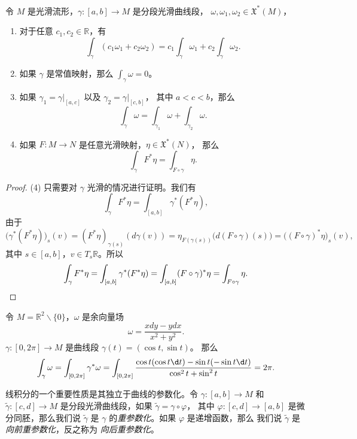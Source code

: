 \documentclass[fontset=none]{Notes}
\begin{document}
\begin{proposition}[线积分的性质]
  令 $M$ 是光滑流形，$\gamma:[a,b]\to M$ 是分段光滑曲线段，
  $\omega,\omega_1,\omega_2\in \mathfrak{X}^*(M)$，
  \begin{enumerate}
    \item 对于任意 $c_1,c_2\in \mathbb{R}$，有
    \[
      \int_\gamma(c_1\omega_1+c_2\omega_2)=c_1\int_\gamma\omega_1+
      c_2\int_\gamma\omega_2.  
    \]
    \item 如果 $\gamma$ 是常值映射，那么 $\int_\gamma\omega=0$。
    \item 如果 $\gamma_1=\gamma|_{[a,c]}$ 以及 $\gamma_2=\gamma|_{[c,b]}$，
    其中 $a<c<b$，那么
    \[
      \int_\gamma\omega=\int_{\gamma_1} \omega+\int_{\gamma_2}\omega.
    \]
    \item 如果 $F:M\to N$ 是任意光滑映射，$\eta\in \mathfrak{X}^*(N)$，
    那么
    \[
      \int_\gamma F^*\eta=\int_{F\circ\gamma}\eta.  
    \]
  \end{enumerate}
\end{proposition}
\begin{proof}
  (4) 只需要对 $\gamma$ 光滑的情况进行证明。我们有
  \[
    \int_\gamma F^*\eta=  \int_{[a,b]}\gamma^*(F^*\eta),
  \]
  由于
  \[
    \bigl(\gamma^*(F^*\eta)\bigr)_s(v)=
    (F^*\eta)_{\gamma(s)}(d\gamma(v))=
    \eta_{F(\gamma(s))}\bigl(d(F\circ\gamma)(s)\bigr)
    =\bigl((F\circ\gamma)^*\eta\bigr)_s(v),
  \]
  其中 $s\in[a,b]$，$v\in T_s \mathbb{R}$。所以
  \[
    \int_\gamma F^*\eta=  \int_{[a,b]}\gamma^*(F^*\eta)
    =\int_{[a,b]}(F\circ\gamma)^*\eta=\int_{F\circ\gamma}\eta.\qedhere
  \]
\end{proof}

\begin{example}\label{exa:covector field on R2-0}
  令 $M=\mathbb{R}^2 \smallsetminus\{0\}$，$\omega$ 是余向量场
  \[
    \omega=\frac{xdy-ydx}{x^2+y^2}.  
  \]
  $\gamma:[0,2\pi]\to M$ 是曲线段 $\gamma(t)=(\cos t,\sin t)$。
  那么
  \[
    \int_\gamma\omega=\int_{[0,2\pi]}\gamma^*\omega=
    \int_{[0,2\pi]}\frac{\cos t(\cos t\d t)-\sin t(-\sin t\d t)}{\cos^2 t+\sin ^2t} 
    =2\pi. 
  \]
\end{example}

线积分的一个重要性质是其独立于曲线的参数化。令 $\gamma:[a,b]\to M$
和 $\tilde\gamma:[c,d]\to M$ 是分段光滑曲线段，如果 $\tilde\gamma=\gamma\circ\varphi$，
其中 $\varphi:[c,d]\to [a,b]$ 是微分同胚，那么我们说 $\tilde{\gamma}$
是 $\gamma$ 的\emph{重参数化}。如果 $\varphi$ 是递增函数，那么
我们说 $\tilde{\gamma}$ 是\emph{向前重参数化}，反之称为%
\emph{向后重参数化}。
\end{document}

